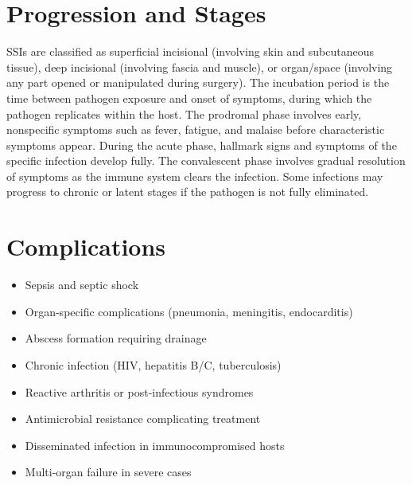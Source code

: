\section{Progression and Stages}
SSIs are classified as superficial incisional (involving skin and subcutaneous tissue), deep incisional (involving fascia and muscle), or organ/space (involving any part opened or manipulated during surgery). The incubation period is the time between pathogen exposure and onset of symptoms, during which the pathogen replicates within the host. The prodromal phase involves early, nonspecific symptoms such as fever, fatigue, and malaise before characteristic symptoms appear. During the acute phase, hallmark signs and symptoms of the specific infection develop fully. The convalescent phase involves gradual resolution of symptoms as the immune system clears the infection. Some infections may progress to chronic or latent stages if the pathogen is not fully eliminated.
\section{Complications}
\begin{itemize}[noitemsep]
  \item Sepsis and septic shock
  \item Organ-specific complications (pneumonia, meningitis, endocarditis)
  \item Abscess formation requiring drainage
  \item Chronic infection (HIV, hepatitis B/C, tuberculosis)
  \item Reactive arthritis or post-infectious syndromes
  \item Antimicrobial resistance complicating treatment
  \item Disseminated infection in immunocompromised hosts
  \item Multi-organ failure in severe cases
\end{itemize}
